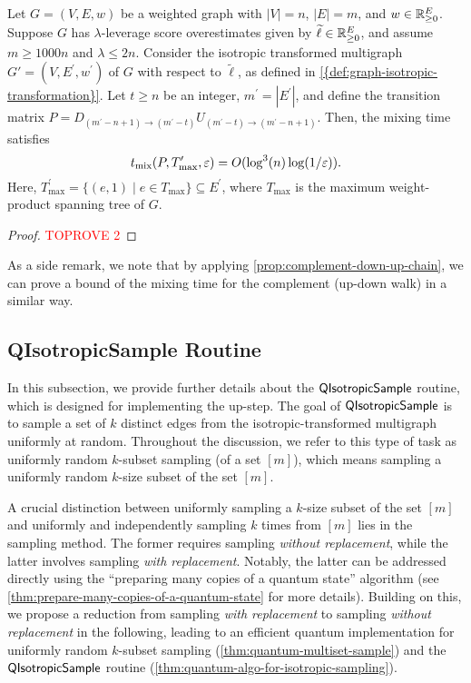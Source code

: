 \documentclass[11pt]{article}
\newcommand{\abss}[1]{\left\lvert #1 \right\rvert}
\newcommand{\parens}[1]{( #1 )}
\newcommand{\sets}[1]{\{ #1 \}}
\begin{document}
{\begin{proposition}\label{prop:isotropic-graph-mixing-time}
  Let $G = (V, E, w)$  be a weighted graph with $\abss{V} = n$, $\abss{E} = m$, and $w \in \mathbb{R}^E_{\geq 0}$. Suppose $G$ has $\lambda$-leverage score overestimates given by $\widetilde \ell\in \mathbb{R}_{\geq 0}^E$, and assume $m \ge 1000 n$ and $\lambda\leq 2n$. Consider the isotropic transformed multigraph  $G'=\parens{V,E^\prime, w^\prime}$  of $G$ with respect to $\widetilde \ell$, as defined in \cref{{def:graph-isotropic-transformation}}.
    Let $t \ge n$ be an integer, $m^\prime=\abss{E^\prime}$, and define the transition matrix
    $P = D _{\parens{m^{\prime}-n+1}\to \parens{m^{\prime}-t}} U_{\parens{m^{\prime}-t}\to \parens{m^\prime-n+1}}$.
    Then, the mixing time satisfies
    \begin{equation}\label{eq:MT}
t_{\mix}\parens{P,T_{\max}^\prime,\varepsilon} = O(\log^3(n) \log(1/\varepsilon)).
    \end{equation}
Here, $T_{\max}^\prime=\sets{\parens{e,1}\mid e\in T_{\max}}\subseteq E^\prime$, where $T_{\max}$ is the maximum weight-product spanning tree of $G$. 
\end{proposition}
\begin{proof}\textcolor{red}{TOPROVE 2}\end{proof}

As a side remark,  we note that by applying \cref{prop:complement-down-up-chain}, 
we can prove a bound of the mixing time for the complement (up-down walk) in a similar way.

\subsection{QIsotropicSample Routine}
In this subsection, we provide further details about the $\mathsf{QIsotropicSample}$ routine,
which is designed for implementing the up-step.
The goal of $\mathsf{QIsotropicSample}$ is to sample a set of $k$ distinct edges from the
isotropic-transformed multigraph uniformly at random.
Throughout the discussion, we refer to this type of task as uniformly random
$k$-subset sampling (of a set $[m]$), which means sampling a uniformly random
$k$-size subset of the set $[m]$.

A crucial distinction between uniformly sampling a $k$-size subset of the set
$[m]$ and uniformly and independently sampling $k$ times from $[m]$ lies in the
sampling method.
The former requires sampling \emph{without replacement}, while the latter
involves sampling \emph{with replacement}.
Notably, the latter can be addressed directly using the ``preparing many copies
of a quantum state'' algorithm (see
\cref{thm:prepare-many-copies-of-a-quantum-state} for more details).
Building on this, we propose a reduction from sampling \emph{with replacement}
to sampling \emph{without replacement} in the following, leading to an efficient
quantum implementation for uniformly random $k$-subset sampling
(\cref{thm:quantum-multiset-sample}) and the $\mathsf{QIsotropicSample}$ routine
(\cref{thm:quantum-algo-for-isotropic-sampling}).

}
\end{document}
